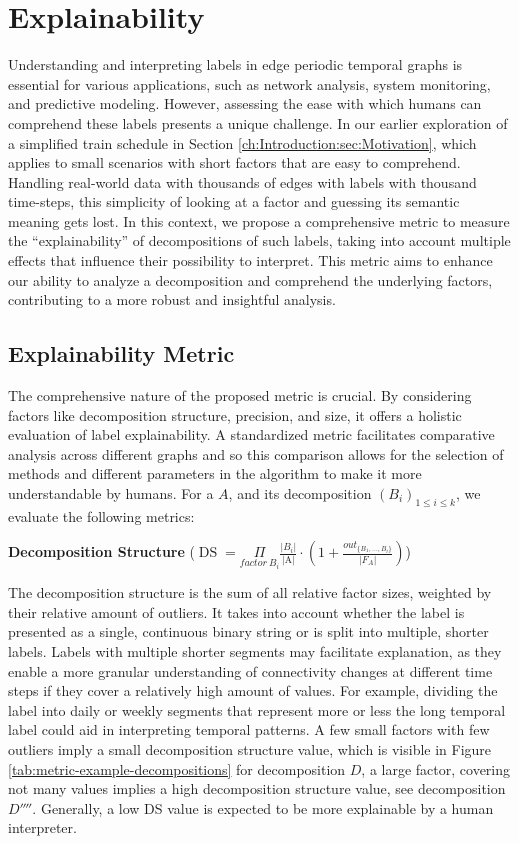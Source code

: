 \chapter{Explainability}
Understanding and interpreting labels in edge periodic temporal graphs is essential for various applications, such as network analysis, system monitoring, and predictive modeling.
However, assessing the ease with which humans can comprehend these labels presents a unique challenge.
In our earlier exploration of a simplified train schedule in Section \ref{ch:Introduction:sec:Motivation}, which applies to small scenarios with short factors that are easy to comprehend.
Handling real-world data with thousands of edges with labels with thousand time-steps, this simplicity of looking at a factor and guessing its semantic meaning gets lost.
In this context, we propose a comprehensive metric to measure the \enquote{explainability} of decompositions of such labels, taking into account multiple effects that influence their possibility to interpret.
This metric aims to enhance our ability to analyze a decomposition and comprehend the underlying factors, contributing to a more robust and insightful analysis.

\section{Explainability Metric}
The comprehensive nature of the proposed metric is crucial.
By considering factors like decomposition structure, precision, and size, it offers a holistic evaluation of label explainability.
A standardized metric facilitates comparative analysis across different graphs and so this comparison allows for the selection of methods and different parameters in the algorithm to make it more understandable by humans.
For a \DFA $A$, and its decomposition $(B_i)_{1 \leq i \leq k}$, we evaluate the following metrics:

\textbf{Decomposition Structure} ($\operatorname{DS} =  \underset{factor~ B_i}{\Pi}\frac{|B_i|}{\text{|A|}} \cdot (1 + \frac{out_{\{B_1,\dots,B_i\}}}{|F_A|})$)

The decomposition structure is the sum of all relative factor sizes, weighted by their relative amount of outliers.
It takes into account whether the label is presented as a single, continuous binary string or is split into multiple, shorter labels.
Labels with multiple shorter segments may facilitate explanation, as they enable a more granular understanding of connectivity changes at different time steps if they cover a relatively high amount of values.
For example, dividing the label into daily or weekly segments that represent more or less the long temporal label could aid in interpreting temporal patterns.
A few small factors with few outliers imply a small decomposition structure value, which is visible in Figure \ref{tab:metric-example-decompositions} for decomposition $D$, a large factor, covering not many values implies a high decomposition structure value, see decomposition $D''''$.
Generally, a low DS value is expected to be more explainable by a human interpreter. 

